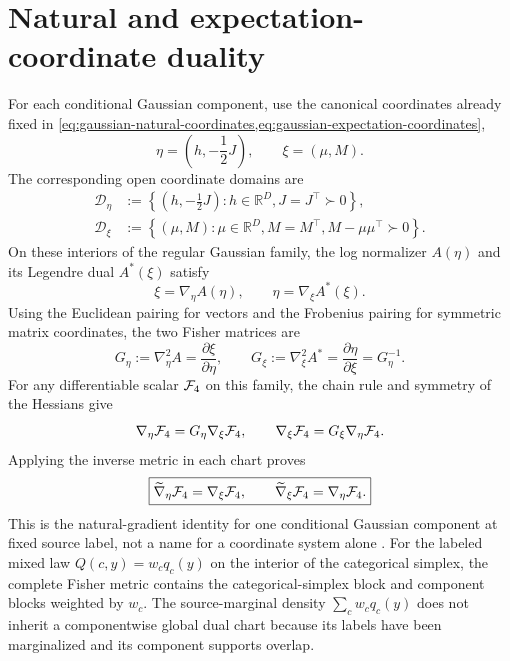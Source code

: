 \section{Natural and expectation-coordinate duality}

For each conditional Gaussian component, use the canonical coordinates already fixed in \cref{eq:gaussian-natural-coordinates,eq:gaussian-expectation-coordinates},
\begin{equation}
\eta=\left(h,-\frac12J\right),
\qquad
\xi=(\mu,M).
\label{eq:canonical-natural-expectation-pairs}
\end{equation}
The corresponding open coordinate domains are
\begin{equation}
\begin{aligned}
\mathcal D_\eta
&:=\left\{\left(h,-\frac12J\right):
h\in\mathbb R^D,
J=J^\top\succ0\right\},\\
\mathcal D_\xi
&:=\left\{(\mu,M):
\mu\in\mathbb R^D,
M=M^\top,
M-\mu\mu^\top\succ0\right\}.
\end{aligned}
\label{eq:gaussian-dual-open-domains}
\end{equation}
On these interiors of the regular Gaussian family, the log normalizer $A(\eta)$ and its Legendre dual $A^*(\xi)$ satisfy
\begin{equation}
\xi=\nabla_\eta A(\eta),
\qquad
\eta=\nabla_\xi A^*(\xi).
\label{eq:legendre-coordinate-duality}
\end{equation}
Using the Euclidean pairing for vectors and the Frobenius pairing for symmetric matrix coordinates, the two Fisher matrices are
\begin{equation}
G_\eta
:=\nabla_\eta^2A
=\frac{\partial\xi}{\partial\eta},
\qquad
G_\xi
:=\nabla_\xi^2A^*
=\frac{\partial\eta}{\partial\xi}
=G_\eta^{-1}.
\label{eq:dual-fisher-hessians}
\end{equation}
For any differentiable scalar $\mathcal F_4$ on this family, the chain rule and symmetry of the Hessians give
\begin{equation}
\nabla_\eta\mathcal F_4
=G_\eta\nabla_\xi\mathcal F_4,
\qquad
\nabla_\xi\mathcal F_4
=G_\xi\nabla_\eta\mathcal F_4.
\label{eq:dual-coordinate-gradient-chain-rule}
\end{equation}
Applying the inverse metric in each chart proves
\begin{equation}
\boxed{
\widetilde\nabla_\eta\mathcal F_4
=\nabla_\xi\mathcal F_4,
\qquad
\widetilde\nabla_\xi\mathcal F_4
=\nabla_\eta\mathcal F_4.}
\label{eq:vfe4-natural-gradient-dual-identity}
\end{equation}
This is the natural-gradient identity for one conditional Gaussian component at fixed source label, not a name for a coordinate system alone \citep{Amari1998,Amari2016}. For the labeled mixed law $Q(c,y)=w_cq_c(y)$ on the interior of the categorical simplex, the complete Fisher metric contains the categorical-simplex block and component blocks weighted by $w_c$. The source-marginal density $\sum_cw_cq_c(y)$ does not inherit a componentwise global dual chart because its labels have been marginalized and its component supports overlap.

